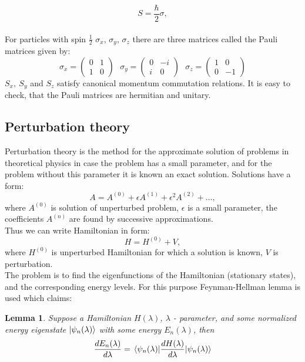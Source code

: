 \documentclass[a4paper, 14pt]{article}
\newtheorem{lemma}{Lemma}
\begin{document}
$$S = \frac{\hbar}{2}\sigma,$$\\
For  particles with spin $\frac{1}{2}$  $\sigma_x$, $\sigma_y$, $\sigma_z$ there are three matrices called  the Pauli matrices given by:
$$\sigma_x = 
\begin{pmatrix}
0 & 1 \\
1 & 0
\end{pmatrix} ~~~
\sigma_y = 
\begin{pmatrix}
0 & -i \\
i & 0
\end{pmatrix} ~~~
\sigma_z = 
\begin{pmatrix}
1 & 0\\
0 & -1
\end{pmatrix}$$
$S_x, ~S_y$ and $S_z$ satisfy  canonical momentum commutation relations. It is easy to check, that the Pauli matrices are hermitian and unitary.


\subsection{Perturbation theory}
Perturbation theory is the method for the approximate solution of problems in theoretical physics in case  the problem has a small parameter, and for the problem without this parameter it is known an exact solution. Solutions have a form:
$$A = A^{(0)}+\epsilon A^{(1)}+ \epsilon^2 A^{(2)}+\hdots,$$
where $A^{(0)}$ is solution of unperturbed problem, $\epsilon$ is a small parameter, the coefficients $A^{(n)}$ are found by successive approximations.\\
Thus we can write Hamiltonian in form:
$$H = H^{(0)} +V,$$
where $H^{(0)}$ is unperturbed Hamiltonian for which a solution is known, $V$ is perturbation.\\
The problem is to find the eigenfunctions of the Hamiltonian (stationary states), and the corresponding energy levels. For this purpose Feynman-Hellman lemma is used which claims:

\begin{lemma}
Suppose a Hamiltonian $H(\lambda)$, $\lambda$ - parameter, and some normalized energy eigenstate $\ket{\psi_n(\lambda)}$ with some energy $E_n(\lambda)$, then
$$\frac{dE_n(\lambda)}{d \lambda}=\mel{\psi_n(\lambda)}{\frac{dH(\lambda)}{d \lambda}}{\psi_n(\lambda)}$$
\end{lemma}
\end{document}

